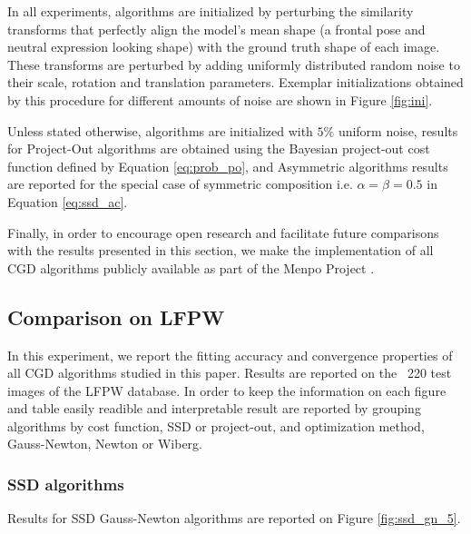 In all experiments, algorithms are initialized by perturbing the similarity transforms that perfectly align the model's mean shape (a frontal pose and neutral expression looking shape) with the ground truth shape of each image. These transforms are perturbed by adding uniformly distributed random noise to their scale, rotation and translation parameters. Exemplar initializations obtained by this procedure for different amounts of noise are shown in Figure \ref{fig:ini}.

Unless stated otherwise, algorithms are initialized with $5\%$ uniform noise, results for Project-Out algorithms are obtained using the Bayesian project-out cost function defined by Equation \ref{eq:prob_po}, and Asymmetric algorithms  results are reported for the special case of symmetric composition i.e. $\alpha=\beta=0.5$ in Equation \ref{eq:ssd_ac}.

Finally, in order to encourage open research and facilitate future comparisons with the results presented in this section, we make the implementation of all CGD algorithms publicly available as part of the Menpo Project \cite{Menpo2014}.

\subsection{Comparison on LFPW}

In this experiment, we report the fitting accuracy and convergence properties of all CGD algorithms studied in this paper. Results are reported on the ~220 test images of the LFPW database. In order to keep the information on each figure and table easily readible and interpretable result are reported by grouping algorithms by cost function, SSD or project-out, and optimization method, Gauss-Newton, Newton or Wiberg.

\subsubsection{SSD algorithms}

Results for SSD Gauss-Newton algorithms are reported on Figure \ref{fig:ssd_gn_5}.

